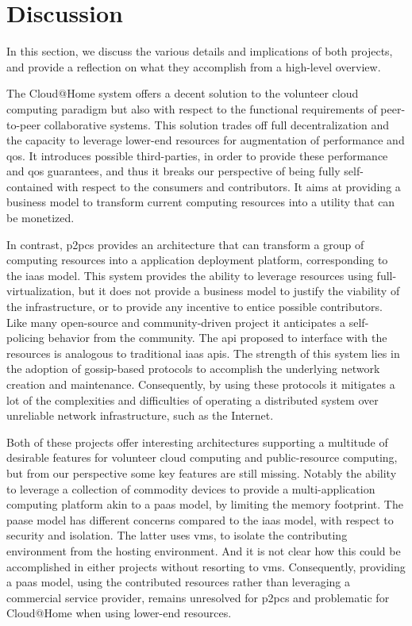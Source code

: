 \documentclass[12pt, titlepage]{uo_temp}
\begin{document}
     \section{Discussion}
     In this section, we discuss the various details and implications of both projects, and
     provide a reflection on what they accomplish from a high-level overview.

     The Cloud@Home system offers a decent solution to the volunteer cloud computing
     paradigm but also with respect to the functional requirements of peer-to-peer
     collaborative systems. This solution trades off full decentralization and the
     capacity to leverage lower-end resources for augmentation of performance and
     \gls{qos}. It introduces possible third-parties, in order to provide these
     performance and \gls{qos} guarantees, and thus it breaks our perspective of being
     fully self-contained with respect to the consumers and contributors. It aims at
     providing a business model to transform current computing resources into a utility
     that can be monetized.
     
     In contrast, \gls{p2pcs} provides an architecture that can transform a group of
     computing resources into a application deployment platform, corresponding to the
     \gls{iaas} model. This system provides the ability to leverage resources using
     full-virtualization, but it does not provide a business model to justify the
     viability of the infrastructure, or to provide any incentive to entice possible
     contributors. Like many open-source and community-driven project it anticipates a
     self-policing behavior from the community. The \gls{api} proposed to interface with
     the resources is analogous to traditional \gls{iaas} \gls{api}s. The strength of this
     system lies in the adoption of gossip-based protocols to accomplish the underlying
     network creation and maintenance. Consequently, by using these protocols it mitigates
     a lot of the complexities and difficulties of operating a distributed system over 
     unreliable network infrastructure, such as the Internet.

     Both of these projects offer interesting architectures supporting a multitude of
     desirable features for volunteer cloud computing and public-resource computing, but
     from our perspective some key features are still missing. Notably the ability to
     leverage a collection of commodity devices to provide a multi-application computing
     platform akin to a \gls{paas} model, by limiting the memory footprint. The
     \gls{paas}e model has different concerns compared to the \gls{iaas} model, with
     respect to security and isolation. The latter uses \gls{vm}s, to isolate the
     contributing environment from the hosting environment. And it is not clear how this
     could be accomplished in either projects without resorting to \gls{vm}s. Consequently,
     providing a \gls{paas} model, using the contributed resources rather than
     leveraging a commercial service provider, remains unresolved for \gls{p2pcs} and
     problematic for Cloud@Home when using lower-end resources.
\end{document}
